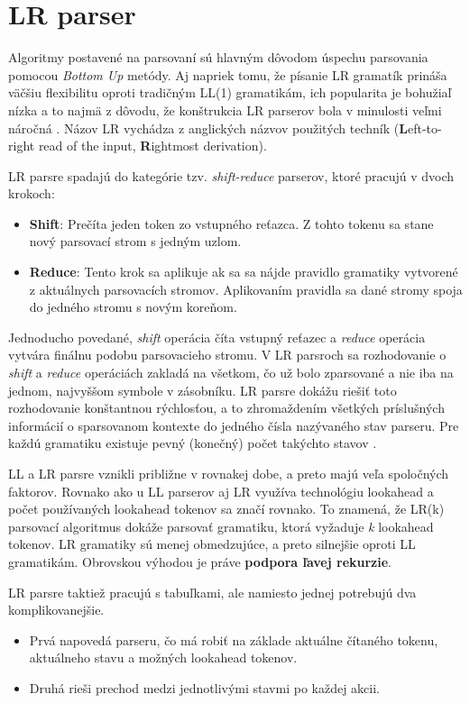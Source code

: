 \section{LR parser}\label{LR}
Algoritmy postavené na  parsovaní sú hlavným dôvodom úspechu parsovania pomocou \textit{Bottom Up} metódy. Aj napriek tomu, že písanie LR gramatík prináša väčšiu flexibilitu oproti tradičným LL(1) gramatikám, ich popularita je bohužiaľ nízka a to najmä z dôvodu, že konštrukcia LR parserov bola v minulosti veľmi náročná \cite{tomassetti:parsing}. Názov LR vychádza z anglických názvov použitých techník (\textbf{L}eft-to-right read of the input, \textbf{R}ightmost derivation).

LR parsre spadajú do kategórie tzv. \textit{shift-reduce} parserov, ktoré pracujú v dvoch krokoch:
\begin{itemize}
\item \textbf{Shift}: Prečíta jeden token zo vstupného reťazca. Z tohto tokenu sa stane nový parsovací strom s jedným uzlom.
\item \textbf{Reduce}: Tento krok sa aplikuje ak sa sa nájde pravidlo gramatiky vytvorené z aktuálnych parsovacích stromov. Aplikovaním pravidla sa dané stromy spoja do jedného stromu s novým koreňom.
\end{itemize}

Jednoducho povedané, \textit{shift} operácia číta vstupný reťazec a \textit{reduce} operácia vytvára finálnu podobu parsovacieho stromu. V LR parsroch sa rozhodovanie o \textit{shift} a \textit{reduce} operáciách zakladá na všetkom, čo už bolo zparsované a nie iba na jednom, najvyššom symbole v zásobníku. LR parsre dokážu riešiť toto rozhodovanie konštantnou rýchlosťou, a to zhromaždením všetkých príslušných informácií o sparsovanom kontexte do jedného čísla nazývaného stav parseru. Pre každú gramatiku existuje pevný (konečný) počet takýchto stavov \cite{LR}.

LL a LR parsre vznikli približne v rovnakej dobe, a preto majú veľa spoločných faktorov. Rovnako ako u LL parserov aj LR využíva technológiu lookahead a počet používaných lookahead tokenov sa značí rovnako. To znamená, že LR(k) parsovací algoritmus dokáže parsovať gramatiku, ktorá vyžaduje \textit{k} lookahead tokenov. LR gramatiky sú menej obmedzujúce, a preto silnejšie oproti LL gramatikám. Obrovskou výhodou je práve \textbf{podpora ľavej rekurzie}.

LR parsre taktiež pracujú s tabuľkami, ale namiesto jednej potrebujú dva komplikovanejšie. 
\begin{itemize}
\item Prvá napovedá parseru, čo má robiť na základe aktuálne čítaného tokenu, aktuálneho stavu a možných lookahead tokenov.
\item Druhá rieši prechod medzi jednotlivými stavmi po každej akcii.
\end{itemize}

